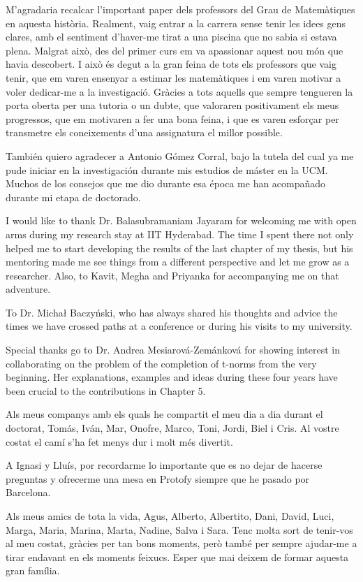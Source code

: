 \documentclass[
    colorlinks, 
    libertine,
]{uninathesis}
\theoremstyle{plain}
\begin{document}
M'agradaria recalcar l'important paper dels professors del Grau de Matemàtiques en aquesta història. Realment, vaig entrar a la carrera sense tenir les idees gens clares, amb el sentiment d'haver-me tirat a una piscina que no sabia si estava plena. Malgrat això, des del primer curs em va apassionar aquest nou món que havia descobert. I això és degut a la gran feina de tots els professors que vaig tenir, que em varen ensenyar a estimar les matemàtiques i em varen motivar a voler dedicar-me a la investigació. Gràcies a tots aquells que sempre tengueren la porta oberta per una tutoria o un dubte, que valoraren positivament els meus progressos, que em motivaren a fer una bona feina, i que es varen esforçar per transmetre els coneixements d'una assignatura el millor possible.

También quiero agradecer a Antonio Gómez Corral, bajo la tutela del cual ya me pude iniciar en la investigación durante mis estudios de máster en la UCM. Muchos de los consejos que me dio durante esa época me han acompañado durante mi etapa de doctorado.

I would like to thank Dr. Balasubramaniam Jayaram for welcoming me with open arms during my research stay at IIT Hyderabad. The time I spent there not only helped me to start developing the results of the last chapter of my thesis, but his mentoring made me see things from a different perspective and let me grow as a researcher. Also, to Kavit, Megha and Priyanka for accompanying me on that adventure.

To Dr. Michał Baczyński, who has always shared his thoughts and advice the times we have crossed paths at a conference or during his visits to my university.

Special thanks go to Dr. Andrea Mesiarová-Zemánková for showing interest in collaborating on the problem of the completion of t-norms from the very beginning. Her explanations, examples and ideas during these four years have been crucial to the contributions in Chapter 5.

Als meus companys amb els quals he compartit el meu dia a dia durant el doctorat, Tomás, Iván, Mar, Onofre, Marco, Toni, Jordi, Biel i Cris. Al vostre costat el camí s'ha fet menys dur i molt més divertit.

A Ignasi y Lluís, por recordarme lo importante que es no dejar de hacerse preguntas y ofrecerme una mesa en Protofy siempre que he pasado por Barcelona.

Als meus amics de tota la vida, Agus, Alberto, Albertito, Dani, David, Luci, Marga, Maria, Marina, Marta, Nadine, Salva i Sara. Tenc molta sort de tenir-vos al meu costat, gràcies per tan bons moments, però també per sempre ajudar-me a tirar endavant en els moments feixucs. Esper que mai deixem de formar aquesta gran família.
\end{document}
